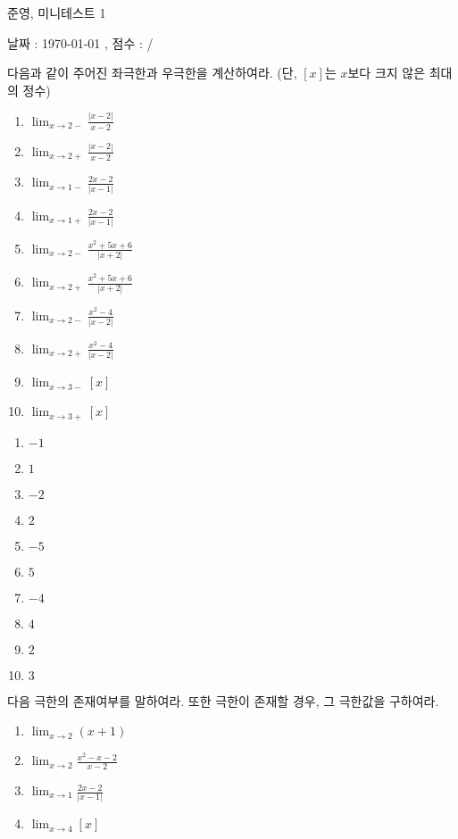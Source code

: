 \documentclass[a4paper]{oblivoir}
\begin{document}
\begin{center}
\LARGE 준영, 미니테스트 1
\end{center}
\begin{center}
날짜 : \today
,\qquad
점수 :  / 
\end{center}


%
\begin{Exercise}
다음과 같이 주어진 좌극한과 우극한을 계산하여라.
(단, \([x]\)는 \(x\)보다 크지 않은 최대의 정수)
\begin{enumerate}[(1)]
\item
\(\displaystyle \lim_{x\to2-}\frac{|x-2|}{x-2}\)
\item
\(\displaystyle \lim_{x\to2+}\frac{|x-2|}{x-2}\)
\item
\(\displaystyle \lim_{x\to1-}\frac{2x-2}{|x-1|}\)
\item
\(\displaystyle \lim_{x\to1+}\frac{2x-2}{|x-1|}\)
\item
\(\displaystyle \lim_{x\to2-}\frac{x^2+5x+6}{|x+2|}\)
\item
\(\displaystyle \lim_{x\to2+}\frac{x^2+5x+6}{|x+2|}\)
\item
\(\displaystyle \lim_{x\to2-}\frac{x^2-4}{|x-2|}\)
\item
\(\displaystyle \lim_{x\to2+}\frac{x^2-4}{|x-2|}\)
\item
\(\displaystyle \lim_{x\to3-}[x]\)
\item
\(\displaystyle \lim_{x\to3+}[x]\)
\end{enumerate}
\end{Exercise}

\begin{Answer}
\begin{enumerate}[(1)]
\item
\(-1\)
\item
\(1\)
\item
\(-2\)
\item
\(2\)
\item
\(-5\)
\item
\(5\)
\item
\(-4\)
\item
\(4\)
\item
\(2\)
\item
\(3\)
\end{enumerate}
\end{Answer}

%
\begin{Exercise}
다음 극한의 존재여부를 말하여라.
또한 극한이 존재할 경우, 그 극한값을 구하여라.
\begin{enumerate}[(1)]
\item
\(\displaystyle \lim_{x\to2}(x+1)\)
\item
\(\displaystyle \lim_{x\to2}\frac{x^2-x-2}{x-2}\)
\item
\(\displaystyle \lim_{x\to1}\frac{2x-2}{|x-1|}\)
\item
\(\displaystyle \lim_{x\to4}[x]\)
\end{enumerate}
\end{Exercise}
\end{document}
